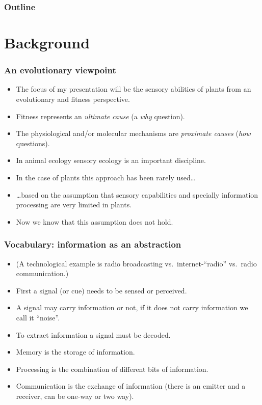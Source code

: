 \documentclass[10pt]{beamer}\usepackage[]{graphicx}\usepackage[]{xcolor}
\begin{document}
	\begin{frame}
		\frametitle{Outline}
		\tableofcontents
	\end{frame}

\section{Background}

\begin{frame}%
  \frametitle{An evolutionary viewpoint}
  \begin{itemize}
    \item The focus of my presentation will be the sensory abilities of plants from an evolutionary and fitness perspective.
    \item Fitness represents an \emph{ultimate cause} (a \emph{why} question).
    \item The physiological and/or molecular mechanisms are \emph{proximate causes} (\emph{how} questions).
    \item In animal ecology sensory ecology is an important discipline.
    \item In the case of plants this approach has been rarely used\ldots
    \item \ldots based on the assumption that sensory capabilities and specially information processing are very limited in plants.
    \item Now we know that this assumption does not hold.
  \end{itemize}
\end{frame}

\begin{frame}%
  \frametitle{Vocabulary: information as an abstraction}
  \begin{itemize}
    \item (A technological example is radio broadcasting vs.\ internet-``radio'' vs.\ radio communication.)
    \item First a signal (or cue) needs to be sensed or perceived.
    \item A signal may carry information or not, if it does not carry information we call it ``noise''.
    \item To extract information a signal must be decoded.
    \item Memory is the storage of information.
    \item Processing is the combination of different bits of information.
    \item Communication is the exchange of information (there is an emitter and a receiver, can be one-way or two way).
  \end{itemize}
\end{frame}
\end{document}
